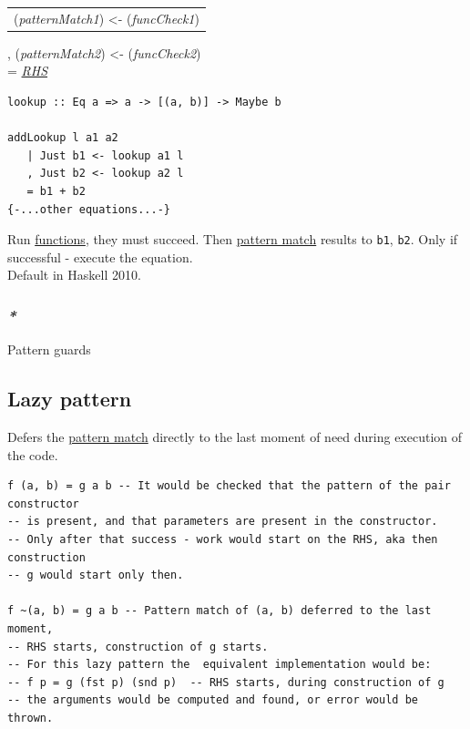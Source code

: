 \documentclass[a4paper,14pt,oneside]{book}
\begin{document}
{\begin{center}
\begin{tabular}{l}
(\emph{patternMatch1}) <- (\emph{funcCheck1})\\
\end{tabular}
\end{center}
, (\emph{patternMatch2}) <- (\emph{funcCheck2})\\
= \emph{\hyperref[orgc0b7246]{RHS}}\\

\begin{verbatim}
lookup :: Eq a => a -> [(a, b)] -> Maybe b

addLookup l a1 a2
   | Just b1 <- lookup a1 l
   , Just b2 <- lookup a2 l
   = b1 + b2
{-...other equations...-}
\end{verbatim}
Run \hyperref[orgf33f5fb]{functions}, they must succeed. Then \hyperref[org8c05feb]{pattern match} results to \texttt{b1}, \texttt{b2}. Only if successful - execute the equation.\\

Default in Haskell 2010.\\

\subsubsection{\emph{*}}
\label{sec:org25acfef}

\label{orga64ef23}Pattern guards\\

\subsection{\label{org996aa75}Lazy pattern}
\label{sec:org342f1c7}
Defers the \hyperref[org8c05feb]{pattern match} directly to the last moment of need during execution of the code.\\

\begin{verbatim}
f (a, b) = g a b -- It would be checked that the pattern of the pair constructor
-- is present, and that parameters are present in the constructor.
-- Only after that success - work would start on the RHS, aka then construction
-- g would start only then.

f ~(a, b) = g a b -- Pattern match of (a, b) deferred to the last moment,
-- RHS starts, construction of g starts.
-- For this lazy pattern the  equivalent implementation would be:
-- f p = g (fst p) (snd p)  -- RHS starts, during construction of g
-- the arguments would be computed and found, or error would be thrown.
\end{verbatim}

}
\end{document}
